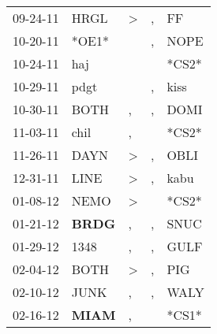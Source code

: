 \begin{supertabular}{p{0.07\textwidth}p{0.06\textwidth}p{0.02\textwidth}p{0.02\textwidth}p{0.06\textwidth}}
          09-24-11\textsuperscript{} &           HRGL\textsuperscript{} &     \textgreater &                , &             FF\textsuperscript{} \\
          10-20-11\textsuperscript{} &                            *OE1* &                  &                , &           NOPE\textsuperscript{} \\
          10-24-11\textsuperscript{} &            haj\textsuperscript{} &                  &                  &                            *CS2* \\
          10-29-11\textsuperscript{} &           pdgt\textsuperscript{} &                  &                , &           kiss\textsuperscript{} \\
          10-30-11\textsuperscript{} &           BOTH\textsuperscript{} &                , &                , &           DOMI\textsuperscript{} \\
          11-03-11\textsuperscript{} &           chil\textsuperscript{} &                , &                  &                            *CS2* \\
          11-26-11\textsuperscript{} &           DAYN\textsuperscript{} &     \textgreater &                , &           OBLI\textsuperscript{} \\
          12-31-11\textsuperscript{} &           LINE\textsuperscript{} &     \textgreater &                , &           kabu\textsuperscript{} \\
          01-08-12\textsuperscript{} &           NEMO\textsuperscript{} &     \textgreater &                  &                            *CS2* \\
          01-21-12\textsuperscript{} &  \textbf{BRDG\textsuperscript{}} &                , &                , &           SNUC\textsuperscript{} \\
          01-29-12\textsuperscript{} &           1348\textsuperscript{} &                , &                , &           GULF\textsuperscript{} \\
          02-04-12\textsuperscript{} &           BOTH\textsuperscript{} &     \textgreater &                , &            PIG\textsuperscript{} \\
          02-10-12\textsuperscript{} &           JUNK\textsuperscript{} &                , &                , &           WALY\textsuperscript{} \\
          02-16-12\textsuperscript{} &  \textbf{MIAM\textsuperscript{}} &                , &                  &                            *CS1* \\

\end{supertabular}
